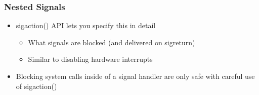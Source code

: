% 
\begin{frame}[fragile]
    \frametitle{Nested Signals}
    \begin{itemize}
        \item sigaction() API lets you specify this in detail
        \begin{itemize}
            \item What signals are blocked (and delivered on sigreturn)
            \item Similar to disabling hardware interrupts
        \end{itemize} \pause
        \item Blocking system calls inside of a signal handler are only safe with careful use of sigaction()
    \end{itemize}
\end{frame}
% 

